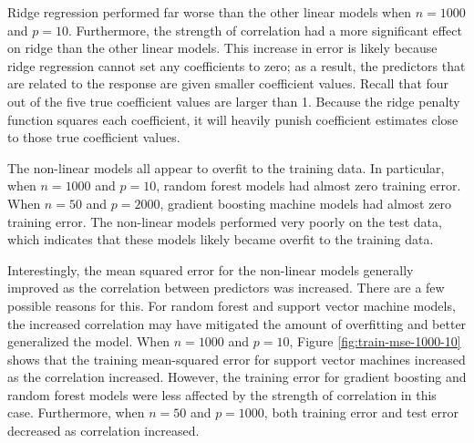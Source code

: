 \documentclass{article}
\begin{document}

Ridge regression performed far worse than the other linear models when $n=1000$ and $p=10$. Furthermore, the strength of correlation had a more significant effect on ridge than the other linear models. This increase in error is likely because ridge regression cannot set any coefficients to zero; as a result, the predictors that are related to the response are given smaller coefficient values. Recall that four out of the five true coefficient values are larger than 1. Because the ridge penalty function squares each coefficient, it will heavily punish coefficient estimates close to those true coefficient values.

The non-linear models all appear to overfit to the training data. In particular, when $n = 1000$ and $p = 10$, random forest models had almost zero training error. When $n = 50$ and $p = 2000$, gradient boosting machine models had almost zero training error. The non-linear models performed very poorly on the test data, which indicates that these models likely became overfit to the training data.

Interestingly, the mean squared error for the non-linear models generally improved as the correlation between predictors was increased. There are a few possible reasons for this. For random forest and support vector machine models, the increased correlation may have mitigated the amount of overfitting and better generalized the model. When $n = 1000$ and $p = 10$, Figure \ref{fig:train-mse-1000-10} shows that the training mean-squared error for support vector machines increased as the correlation increased. However, the training error for gradient boosting and random forest models were less affected by the strength of correlation in this case. Furthermore, when $n = 50$ and $p = 1000$, both training error and test error decreased as correlation increased.
\end{document}
